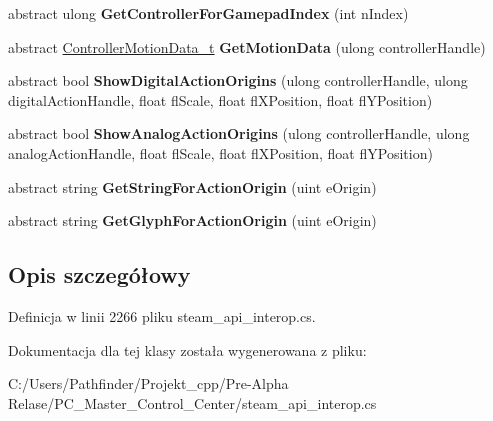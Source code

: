 \begin{DoxyCompactItemize}
abstract ulong {\bfseries Get\+Controller\+For\+Gamepad\+Index} (int n\+Index)
\item 
\mbox{\label{class_valve_1_1_steamworks_1_1_i_steam_controller_a920fc888d3d9aba9c11cb2f3ec6168ba}} 
abstract \hyperlink{struct_valve_1_1_steamworks_1_1_controller_motion_data__t}{Controller\+Motion\+Data\+\_\+t} {\bfseries Get\+Motion\+Data} (ulong controller\+Handle)
\item 
\mbox{\label{class_valve_1_1_steamworks_1_1_i_steam_controller_a8b1753c6378d1c4ab043ad1cc10c3ad5}} 
abstract bool {\bfseries Show\+Digital\+Action\+Origins} (ulong controller\+Handle, ulong digital\+Action\+Handle, float fl\+Scale, float fl\+X\+Position, float fl\+Y\+Position)
\item 
\mbox{\label{class_valve_1_1_steamworks_1_1_i_steam_controller_ad63136fac005637f242bc194765b0928}} 
abstract bool {\bfseries Show\+Analog\+Action\+Origins} (ulong controller\+Handle, ulong analog\+Action\+Handle, float fl\+Scale, float fl\+X\+Position, float fl\+Y\+Position)
\item 
\mbox{\label{class_valve_1_1_steamworks_1_1_i_steam_controller_a83e569505a9f6e99dcd296b45d113900}} 
abstract string {\bfseries Get\+String\+For\+Action\+Origin} (uint e\+Origin)
\item 
\mbox{\label{class_valve_1_1_steamworks_1_1_i_steam_controller_a3460875410af6cb201135d08ac47fa31}} 
abstract string {\bfseries Get\+Glyph\+For\+Action\+Origin} (uint e\+Origin)
\end{DoxyCompactItemize}


\subsection{Opis szczegółowy}


Definicja w linii 2266 pliku steam\+\_\+api\+\_\+interop.\+cs.



Dokumentacja dla tej klasy została wygenerowana z pliku\+:\begin{DoxyCompactItemize}
\item 
C\+:/\+Users/\+Pathfinder/\+Projekt\+\_\+cpp/\+Pre-\/\+Alpha Relase/\+P\+C\+\_\+\+Master\+\_\+\+Control\+\_\+\+Center/steam\+\_\+api\+\_\+interop.\+cs\end{DoxyCompactItemize}

